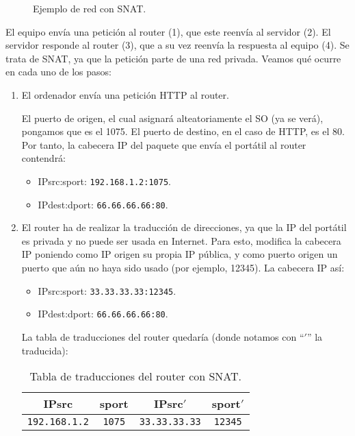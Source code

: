 \begin{ejemplo}
\begin{figure}
\begin{tikzpicture}[node distance=6cm]
        \end{tikzpicture}
        \caption{Ejemplo de red con \acrshort{SNAT}.}
        \label{fig:ejemplo_nat}
    \end{figure}

    El equipo envía una petición al router (1), que este reenvía al servidor (2). El servidor responde al router (3), que a su vez reenvía la respuesta al equipo (4). Se trata de \acrshort{SNAT}, ya que la petición parte de una red privada. Veamos qué ocurre en cada uno de los pasos:
    \begin{enumerate}[label=(\arabic*)]
        \item El ordenador envía una petición \acrshort{HTTP} al router.
        
        El puerto de origen, el cual asignará alteatoriamente el SO (ya se verá), pongamos que es el 1075. El puerto de destino, en el caso de \acrshort{HTTP}, es el 80. Por tanto, la cabecera IP del paquete que envía el portátil al router contendrá:
        \begin{itemize}
            \item {IPsrc}:{sport}: \verb|192.168.1.2:1075|.
            \item {IPdest}:{dport}: \verb|66.66.66.66:80|.
        \end{itemize}
            
        \item El router ha de realizar la traducción de direcciones, ya que la IP del portátil es privada y no puede ser usada en Internet. Para esto, modifica la cabecera IP poniendo como IP origen su propia IP pública, y como puerto origen un puerto que aún no haya sido usado (por ejemplo, 12345). La cabecera IP así:
        \begin{itemize}
            \item {IPsrc}:{sport}: \verb|33.33.33.33:12345|.
            \item {IPdest}:{dport}: \verb|66.66.66.66:80|.
        \end{itemize}

        La tabla de traducciones del router quedaría (donde notamos con ``$'$'' la traducida):
        \begin{table}[H]
            \centering
            \begin{tabular}{|c|c||c|c|}
                \hline
                IPsrc & sport & IPsrc$'$ & sport$'$ \\
                \hline
                \verb|192.168.1.2| & \verb|1075| & \verb|33.33.33.33| & \verb|12345|\\
                \hline
            \end{tabular}
            \caption{Tabla de traducciones del router con SNAT.}
            \label{tab:tabla_traducciones}            
        \end{table}


\end{enumerate}
\end{ejemplo}
